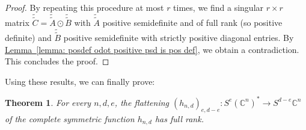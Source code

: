 \documentclass[11pt]{article}
\numberwithin{equation}{section}
\newtheorem{theorem}{Theorem}[section]
\theoremstyle{definition}
\theoremstyle{plain}
\newcommand{\expref}[2]{\hyperref[#2]{#1~\ref{#2}}}
\newcommand{\bbC}{\mathbb{C}}
\renewcommand{\tilde}[1]{\widetilde{#1}}
\begin{document}
\begin{proof}
By repeating this procedure at most $r$ times, we find a singular $r\times r$ matrix $\tilde{\tilde{C}} =  \tilde{\tilde{A}} \odot \tilde{\tilde{B}}$ with $\tilde{\tilde{A}}$ positive semidefinite and of full rank (so positive definite) and $\tilde{\tilde{B}}$ positive semidefinite with strictly positive diagonal entries. By \expref{Lemma}{lemma: posdef odot positive psd is pos def}, we obtain a contradiction. This concludes the proof.
\end{proof}

Using these results, we can finally prove:
\begin{theorem}\label{thm: hnd have maximal catalecticant rank}
 For every $n,d,e$, the flattening $(h_{n,d})_{e,d-e} : S^e (\bbC^n)^* \to S^{d-e} \bbC^n$ of the complete symmetric function $h_{n,d}$ has full rank.
\end{theorem}
\end{document}
